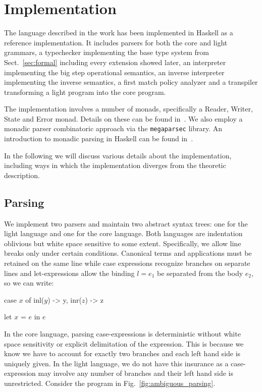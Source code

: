 \chapter{Implementation}\label{sec:implementation}

The language described in the work has been implemented in Haskell as a
reference implementation. It includes parsers for both the core and light
grammars, a typechecker implementing the base type system from
Sect.~\ref{sec:formal} including every extension showed later, an interpreter
implementing the big step operational semantics, an inverse interpreter
implementing the inverse semantics, a first match policy analyzer and a
transpiler transforming a light program into the core program.

The implementation involves a number of monads, specifically a Reader, Writer,
State and Error monad. Details on these can be found in~\cite{Jones:1995}. We
also employ a monadic parser combinatoric approach via the \texttt{megaparsec}
library. An introduction to monadic parsing in Haskell can be found
in~\cite{Hutton:1998}.

In the following we will discuss various details about the implementation,
including ways in which the implementation diverges from the theoretic
description.

\section{Parsing}

We implement two parsers and maintain two abstract syntax trees: one for the
light language and one for the core language. Both languages are indentation
oblivious but white space sensitive to some extent. Specifically, we allow line
breaks only under certain conditions. Canonical terms and applications must be
retained on the same line while case expressions recognize branches on separate
lines and let-expressions allow the binding $l = e_1$ be separated from the
body $e_2$, so we can write:

\begin{rfuncode}
case $x$ of
  inl($y$) -> y,
  inr($z$) -> z

let $x$ = $e$
in $e$
\end{rfuncode}

In the core language, parsing case-expressions is deterministic without white
space sensitivity or explicit delimitation of the expression. This is because
we know we have to account for exactly two branches and each left hand side is
uniquely given. In the light language, we do not have this insurance as a
case-expression may involve any number of branches and their left hand side is
unrestricted. Consider the program in Fig.~\ref{fig:ambiguous_parsing}.

